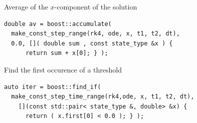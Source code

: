 \begin{frame}[fragile]


\vspace{2ex}

Average of the $x$-component of the solution
\begin{lstlisting}[basicstyle=\footnotesize\ttfamily]
double av = boost::accumulate(
  make_const_step_range(rk4, ode, x, t1, t2, dt),
  0.0, []( double sum , const state_type &x ) {
      return sum + x[0]; } );
\end{lstlisting}

\vspace{2ex}

Find the first occurence of a threshold
\begin{lstlisting}[basicstyle=\footnotesize\ttfamily]
auto iter = boost::find_if(
  make_const_step_time_range(rk4,ode, x, t1, t2, dt),
    [](const std::pair< state_type &, double> &x) {
      return ( x.first[0] < 0.0 ); } );
\end{lstlisting}


\end{frame}






